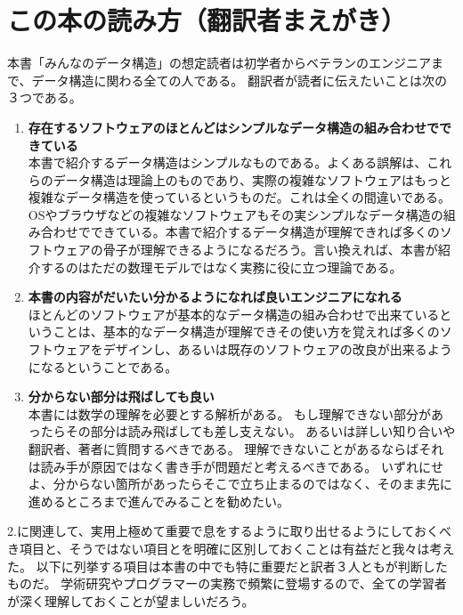 \chapter*{この本の読み方（翻訳者まえがき）}

本書「みんなのデータ構造」の想定読者は初学者からベテランのエンジニアまで、データ構造に関わる全ての人である。
翻訳者が読者に伝えたいことは次の３つである。

\begin{enumerate}
\item {\bf 存在するソフトウェアのほとんどはシンプルなデータ構造の組み合わせでできている} \\
本書で紹介するデータ構造はシンプルなものである。よくある誤解は、これらのデータ構造は理論上のものであり、実際の複雑なソフトウェアはもっと複雑なデータ構造を使っているというものだ。これは全くの間違いである。OSやブラウザなどの複雑なソフトウェアもその実シンプルなデータ構造の組み合わせでできている。本書で紹介するデータ構造が理解できれば多くのソフトウェアの骨子が理解できるようになるだろう。言い換えれば、本書が紹介するのはただの数理モデルではなく実務に役に立つ理論である。

\item {\bf 本書の内容がだいたい分かるようになれば良いエンジニアになれる} \\
ほとんどのソフトウェアが基本的なデータ構造の組み合わせで出来ているということは、基本的なデータ構造が理解できその使い方を覚えれば多くのソフトウェアをデザインし、あるいは既存のソフトウェアの改良が出来るようになるということである。

\item {\bf 分からない部分は飛ばしても良い} \\
本書には数学の理解を必要とする解析がある。
もし理解できない部分があったらその部分は読み飛ばしても差し支えない。
あるいは詳しい知り合いや翻訳者、著者に質問するべきである。
理解できないことがあるならばそれは読み手が原因ではなく書き手が問題だと考えるべきである。
いずれにせよ、分からない箇所があったらそこで立ち止まるのではなく、そのまま先に進めるところまで進んでみることを勧めたい。

\end{enumerate}

2.に関連して、実用上極めて重要で息をするように取り出せるようにしておくべき項目と、そうではない項目とを明確に区別しておくことは有益だと我々は考えた。
以下に列挙する項目は本書の中でも特に重要だと訳者３人ともが判断したものだ。
学術研究やプログラマーの実務で頻繁に登場するので、全ての学習者が深く理解しておくことが望ましいだろう。

